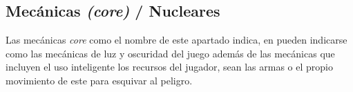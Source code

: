    \subsection{Mecánicas \textit{(core)} / Nucleares }
        Las mecánicas \textit{core} como el nombre de este apartado indica, en \TWD pueden indicarse como las mecánicas de luz y oscuridad del juego además de las mecánicas que incluyen el uso inteligente los recursos del jugador, sean las armas o el propio movimiento de este para esquivar al peligro.

